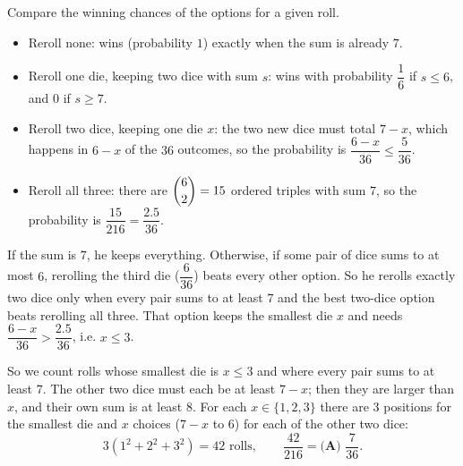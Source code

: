Compare the winning chances of the options for a given roll.
\begin{itemize}
\item Reroll none: wins (probability $1$) exactly when the sum is already $7$.
\item Reroll one die, keeping two dice with sum $s$: wins with probability $\dfrac16$ if $s\le6$, and $0$ if $s\ge7$.
\item Reroll two dice, keeping one die $x$: the two new dice must total $7-x$, which happens in $6-x$ of the $36$ outcomes, so the probability is $\dfrac{6-x}{36}\le\dfrac{5}{36}$.
\item Reroll all three: there are $\dbinom62=15$ ordered triples with sum $7$, so the probability is $\dfrac{15}{216}=\dfrac{2.5}{36}$.
\end{itemize}
If the sum is $7$, he keeps everything. Otherwise, if some pair of dice sums to at most $6$, rerolling the third die ($\dfrac{6}{36}$) beats every other option. So he rerolls exactly two dice only when every pair sums to at least $7$ and the best two-dice option beats rerolling all three. That option keeps the smallest die $x$ and needs $\dfrac{6-x}{36}>\dfrac{2.5}{36}$, i.e. $x\le3$.

So we count rolls whose smallest die is $x\le3$ and where every pair sums to at least $7$. The other two dice must each be at least $7-x$; then they are larger than $x$, and their own sum is at least $8$. For each $x\in\{1,2,3\}$ there are $3$ positions for the smallest die and $x$ choices ($7-x$ to $6$) for each of the other two dice:
\[3\left(1^2+2^2+3^2\right)=42\text{ rolls},\qquad\dfrac{42}{216}=\boxed{\textbf{(A) }\dfrac{7}{36}}.\]
